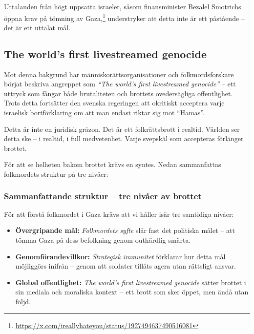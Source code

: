 Uttalanden från högt uppsatta israeler, såsom finansminister Bezalel Smotrichs öppna krav på tömning av Gaza,\footnote{\url{https://x.com/ireallyhateyou/status/1927494637490516081}} understryker att detta inte är ett påstående – det är ett uttalat mål.

\subsection{The world’s first livestreamed genocide}
Mot denna bakgrund har människorättsorganisationer och folkmordsforskare börjat beskriva angreppet som \textit{“The world’s first livestreamed genocide”} – ett uttryck som fångar både brutaliteten och brottets ovedersägliga offentlighet. Trots detta fortsätter den svenska regeringen att okritiskt acceptera varje israelisk bortförklaring om att man endast riktar sig mot \enquote{Hamas}.


\medskip

Detta är inte en juridisk gråzon. Det är ett folkrättsbrott i realtid.
Världen ser detta ske – i realtid, i full medvetenhet. Varje svepskäl som accepteras förlänger brottet.

\medskip

För att se helheten bakom brottet krävs en syntes. Nedan sammanfattas folkmordets struktur på tre nivåer:


\subsubsection*{Sammanfattande struktur – tre nivåer av brottet}

För att förstå folkmordet i Gaza krävs att vi håller isär tre samtidiga nivåer:

\begin{itemize}
  \item \textbf{Övergripande mål:} \textit{Folkmordets syfte} slår fast det politiska målet – att tömma Gaza på dess befolkning genom outhärdlig smärta.
  
  \item \textbf{Genomförandevillkor:} \textit{Strategisk immunitet} förklarar hur detta mål möjliggörs inifrån – genom att soldater tillåts agera utan rättsligt ansvar.

  \item \textbf{Global offentlighet:} \textit{The world’s first livestreamed genocide} sätter brottet i sin mediala och moraliska kontext – ett brott som sker öppet, men ändå utan följd.
\end{itemize}

